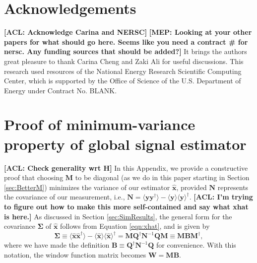 \documentclass[twolcolumn,apj,iop,numberedappendix]{emulateapj}
\newcommand{\xhat}{\hat{\mathbf{x}}}
\newcommand{\N}{\mathbf{N}}
\newcommand{\Q}{\mathbf{Q}}
\newcommand{\M}{\mathbf{M}}
\newcommand{\W}{\mathbf{W}}
\newcommand{\acl}[1]{{\color{red} \textbf{[ACL:  #1]}}}
\newcommand{\mep}[1]{{\color{applegreen} \textbf{[MEP:  #1]}}}
\begin{document}
\section{Acknowledgements}
\acl{Acknowledge Carina and NERSC}
\mep{Looking at your other papers for what should go here. Seems like you need a contract \# for nersc. Any funding sources that should be added?}
It brings the authors great pleasure to thank Carina Cheng and Zaki Ali for useful discussions. This research used resources of the National Energy Research Scientific Computing Center, which is supported by the Office of Science of the U.S. Department of Energy under Contract No. BLANK. 


\appendix
\section{Proof of minimum-variance property of global signal estimator}
\label{minVarProof}
\acl{Check generality wrt H}
In this Appendix, we provide a constructive proof that choosing $\M$ to be diagonal (as we do in this paper starting in Section \ref{sec:BetterM}) minimizes the variance of our estimator $\xhat$, provided $\N$ represents the covariance of our measurement, i.e., $\N = \langle \mathbf{y} \mathbf{y}^\dagger \rangle - \langle \mathbf{y} \rangle \langle \mathbf{y} \rangle^\dagger$. \acl{I'm trying to figure out how to make this more self-contained and say what xhat is here.} As discussed in Section \ref{sec:SimResults}, the general form for the covariance $\boldsymbol \Sigma$ of $\xhat$ follows from Equation \eqref{eqn:xhat}, and is given by
\begin{equation}
\boldsymbol \Sigma \equiv \langle \xhat \xhat^\dagger \rangle - \langle \xhat \rangle \langle \xhat \rangle^\dagger = \M \Q^\dagger \N^{-1} \Q \M \equiv \M \mathbf{B} \M^\dagger,
\end{equation}
where we have made the definition $\mathbf{B} \equiv \Q^\dagger \N^{-1} \Q$ for convenience. With this notation, the window function matrix becomes $\W = \M \mathbf{B}$.
\end{document}
